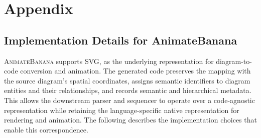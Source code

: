 \documentclass{article} %
\begin{document}




\section{Appendix}

\subsection{Implementation Details for AnimateBanana}

\textsc{AnimateBanana} supports SVG, as the underlying representation for diagram-to-code conversion and animation. The generated code preserves the mapping with the source diagram's spatial coordinates, assigns semantic identifiers to diagram entities and their relationships, and records semantic and hierarchical metadata. This allows the downstream parser and sequencer to operate over a code-agnostic representation while retaining the language-specific native representation for rendering and animation. The following describes the implementation choices that enable this correspondence.
\end{document}
